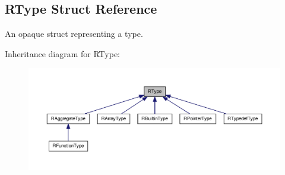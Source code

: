 \hypertarget{struct_r_type}{\subsection{R\-Type Struct Reference}
\label{struct_r_type}
}


An opaque struct representing a type.  




Inheritance diagram for R\-Type\-:\nopagebreak
\begin{figure}[H]
\begin{center}
\leavevmode
\includegraphics[width=350pt]{struct_r_type__inherit__graph}
\end{center}
\end{figure}
